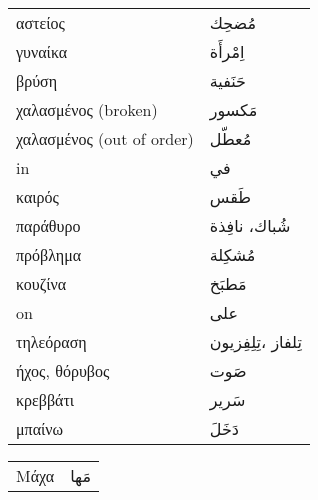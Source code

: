 \documentclass[twocolumn,a4paper]{article}
\newcommand{\ar}[1]{\textarabic{#1}}
\begin{document}
\begin{mpsupertabular}{ P{0.5\textwidth} P{0.5\textwidth} }
αστείος              & \ar{ مُضحِك } \\
γυναίκα              & \ar{ اِمْرأَة } \\
βρύση                & \ar{ حَنَفية } \\
χαλασμένος (broken)  & \ar{ مَكسور } \\
χαλασμένος (out of order)  & \ar{ مُعطّل } \\
in                   & \ar{ في } \\
καιρός               & \ar{ طَقس } \\
παράθυρο             & \ar{ شُباك، نافِذة } \\
πρόβλημα             & \ar{ مُشكِلة } \\
κουζίνα              & \ar{ مَطبَخ } \\
on                   & \ar{ على } \\
τηλεόραση            & \ar{  تِلفاز ،تِلِفِزيون } \\
ήχος, θόρυβος        & \ar{ صَوت } \\
κρεββάτι             & \ar{ سَرير } \\
μπαίνω               & \ar{ دَخَلَ } \\

\end{mpsupertabular}
\clearpage

\begin{mpsupertabular}{ P{0.5\textwidth} P{0.5\textwidth} }
Μάχα               & \ar{ مَها } \\
\end{mpsupertabular}

\clearpage
\end{document}
